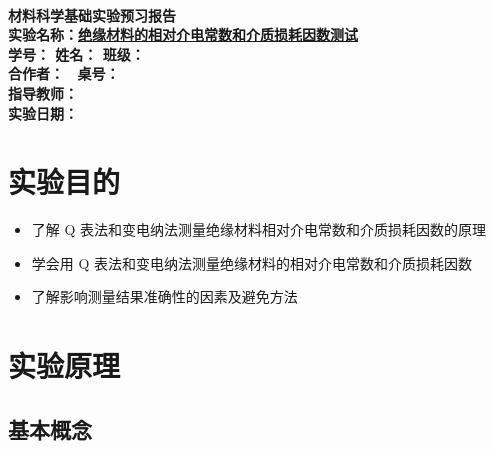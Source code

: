 \documentclass[a4paper,utf8]{article}
\begin{document}
\begin{center}
    {\mbox{}\\[7em]\bfseries\songti%
    材料科学基础实验预习报告}\\[34mm]
    {\bfseries\songti
    实验名称：\uline{\hfill\mbox{绝缘材料的相对介电常数和介质损耗因数测试}\hfill} \\[2.9mm]
    学\quad 号：\uline{}\hfill
    姓\quad 名：\uline{}\hfill
    班\quad 级：\uline{} \\[2.9mm]
    合作者：\uline{\makebox[25mm]{}}\enspace~
    桌\quad 号：\uline{\makebox[25mm]{}}\hfill\mbox{}\\[2.9mm]
    指导教师：\uline{}\hfill\mbox{} \\[2.9mm]
    实验日期：\uline{\makebox[30mm]{}}\hfill\mbox{} \\[58.7mm]
    }
\end{center}
\newpage
\section{实验目的}
    \begin{itemize}
        \item 了解 Q 表法和变电纳法测量绝缘材料相对介电常数和介质损耗因数的原理
        \item 学会用 Q 表法和变电纳法测量绝缘材料的相对介电常数和介质损耗因数
        \item 了解影响测量结果准确性的因素及避免方法
    \end{itemize}
\section{实验原理}%
    \subsection{基本概念}
\end{document}
